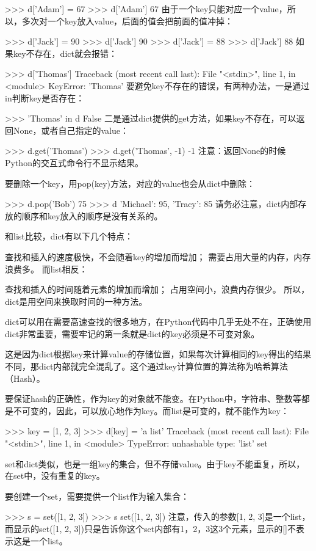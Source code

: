 \documentclass[10pt,a4paper]{ctexbook}
\begin{document}
>>> d['Adam'] = 67
>>> d['Adam']
67
由于一个key只能对应一个value，所以，多次对一个key放入value，后面的值会把前面的值冲掉：

>>> d['Jack'] = 90
>>> d['Jack']
90
>>> d['Jack'] = 88
>>> d['Jack']
88
如果key不存在，dict就会报错：

>>> d['Thomas']
Traceback (most recent call last):
  File "<stdin>", line 1, in <module>
KeyError: 'Thomas'
要避免key不存在的错误，有两种办法，一是通过in判断key是否存在：

>>> 'Thomas' in d
False
二是通过dict提供的get方法，如果key不存在，可以返回None，或者自己指定的value：

>>> d.get('Thomas')
>>> d.get('Thomas', -1)
-1
注意：返回None的时候Python的交互式命令行不显示结果。

要删除一个key，用pop(key)方法，对应的value也会从dict中删除：

>>> d.pop('Bob')
75
>>> d
{'Michael': 95, 'Tracy': 85}
请务必注意，dict内部存放的顺序和key放入的顺序是没有关系的。

和list比较，dict有以下几个特点：

查找和插入的速度极快，不会随着key的增加而增加；
需要占用大量的内存，内存浪费多。
而list相反：

查找和插入的时间随着元素的增加而增加；
占用空间小，浪费内存很少。
所以，dict是用空间来换取时间的一种方法。

dict可以用在需要高速查找的很多地方，在Python代码中几乎无处不在，正确使用dict非常重要，需要牢记的第一条就是dict的key必须是不可变对象。

这是因为dict根据key来计算value的存储位置，如果每次计算相同的key得出的结果不同，那dict内部就完全混乱了。这个通过key计算位置的算法称为哈希算法（Hash）。

要保证hash的正确性，作为key的对象就不能变。在Python中，字符串、整数等都是不可变的，因此，可以放心地作为key。而list是可变的，就不能作为key：

>>> key = [1, 2, 3]
>>> d[key] = 'a list'
Traceback (most recent call last):
  File "<stdin>", line 1, in <module>
TypeError: unhashable type: 'list'
set

set和dict类似，也是一组key的集合，但不存储value。由于key不能重复，所以，在set中，没有重复的key。

要创建一个set，需要提供一个list作为输入集合：

>>> s = set([1, 2, 3])
>>> s
set([1, 2, 3])
注意，传入的参数[1, 2, 3]是一个list，而显示的set([1, 2, 3])只是告诉你这个set内部有1，2，3这3个元素，显示的[]不表示这是一个list。
\end{document}
